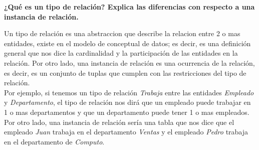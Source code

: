 \begin{center}
    \textbf{¿Qué es un tipo de relación? Explica las diferencias con respecto a una instancia 
    de relación.}
\end{center}

\vspace{.3cm}

Un tipo de relación es una abstraccion que describe la relacion entre 2 o mas entidades, existe
en el modelo de conceptual de datos; es decir, es una definición general que nos dice la cardinalidad
y la participación de las entidades en la relación. Por otro lado, una instancia de relación es 
una ocurrencia de la relación, es decir, es un conjunto de tuplas que cumplen con las 
restricciones del tipo de relación.\\

Por ejemplo, si tenemos un tipo de relación \textit{Trabaja} entre las entidades \textit{Empleado} 
y \textit{Departamento}, el tipo de relación nos dirá que un empleado puede trabajar en 1 o mas
departamentos y que un departamento puede tener 1 o mas empleados. Por otro lado, una instancia de
relación sería una tabla que nos dice que el empleado \textit{Juan} trabaja en el departamento
\textit{Ventas} y el empleado \textit{Pedro} trabaja en el departamento de \textit{Computo}.\\